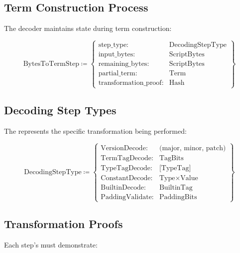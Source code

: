 \documentclass[../midgard.tex]{subfiles}
\begin{document}
\subsection{Term Construction Process}

The decoder maintains state during term construction:

\begin{equation*}
    \text{BytesToTermStep} \coloneq \left\{
    \begin{array}{ll}
        \text{step\_type} : & \text{DecodingStepType} \\
        \text{input\_bytes} : & \text{ScriptBytes} \\
        \text{remaining\_bytes} : & \text{ScriptBytes} \\
        \text{partial\_term} : & \text{Term} \\
        \text{transformation\_proof} : & \text{Hash}
    \end{array} \right\}
\end{equation*}

\subsection{Decoding Step Types}

The  represents the specific transformation being performed:

\begin{equation*}
    \text{DecodingStepType} \coloneq \left\{
    \begin{array}{ll}
        \text{VersionDecode} : & \text{(major, minor, patch)} \\
        \text{TermTagDecode} : & \text{TagBits} \\
        \text{TypeTagDecode} : & \text{[TypeTag]} \\
        \text{ConstantDecode} : & \text{Type} \times \text{Value} \\
        \text{BuiltinDecode} : & \text{BuiltinTag} \\
        \text{PaddingValidate} : & \text{PaddingBits}
    \end{array} \right\}
\end{equation*}

\subsection{Transformation Proofs}

Each step's  must demonstrate:
\end{document}
